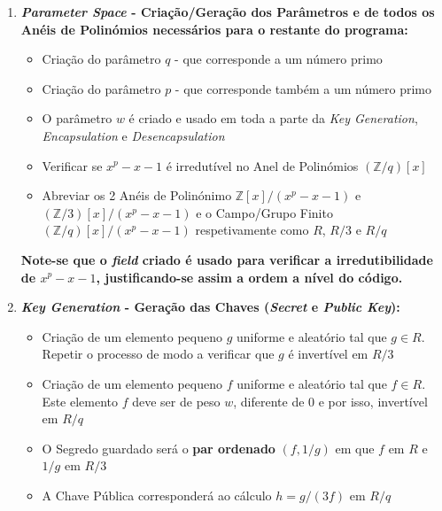 \documentclass[12pt]{report}
\providecommand{\tightlist}{%
      \setlength{\itemsep}{0pt}\setlength{\parskip}{0pt}}
\begin{document}
\begin{enumerate}
\def\labelenumi{\arabic{enumi}.}
\item
  \textbf{\emph{Parameter Space} - Criação/Geração dos Parâmetros e de
  todos os Anéis de Polinómios necessários para o restante do programa:}

  \begin{itemize}
  \tightlist
  \item
    Criação do parâmetro \(q\) - que corresponde a um número primo
  \item
    Criação do parâmetro \(p\) - que corresponde também a um número
    primo
  \item
    O parâmetro \(w\) é criado e usado em toda a parte da \emph{Key
    Generation}, \emph{Encapsulation} e \emph{Desencapsulation}
  \item
    Verificar se \(x^{p}-x-1\) é irredutível no Anel de Polinómios
    \((\mathbb{Z}/q)[x]\)
  \item
    Abreviar os 2 Anéis de Polinónimo \(\mathbb{Z}[x]/(x^{p}-x-1)\) e
    \((\mathbb{Z}/3)[x]/(x^{p}-x-1)\) e o Campo/Grupo Finito
    \((\mathbb{Z}/q)[x]/(x^{p}-x-1)\) respetivamente como \({R}\),
    \({R}/3\) e \({R}/q\)
  \end{itemize}

  \textbf{Note-se que o \emph{field} criado é usado para verificar a
  irredutibilidade de \(x^{p}-x-1\), justificando-se assim a ordem a
  nível do código.}
\vspace{3mm}

\item
  \textbf{\emph{Key Generation} - Geração das Chaves (\emph{Secret} e
  \emph{Public Key}):}

  \begin{itemize}
  \tightlist
  \item
    Criação de um elemento pequeno \(g\) uniforme e aleatório tal que
    \(g\in{R}\). Repetir o processo de modo a verificar que \(g\) é
    invertível em \({R}/3\)
  \item
    Criação de um elemento pequeno \(f\) uniforme e aleatório tal que
    \(f\in{R}\). Este elemento \(f\) deve ser de peso \(w\), diferente
    de 0 e por isso, invertível em \({R}/q\)
  \item
    O Segredo guardado será o \textbf{par ordenado} \((f, 1/g)\) em que
    \(f\) em \({R}\) e \(1/g\) em \({R}/3\)
  \item
    A Chave Pública corresponderá ao cálculo \(h = g/(3f)\) em \({R}/q\)
  \end{itemize}
\vspace{3mm}


\end{enumerate}
\end{document}
